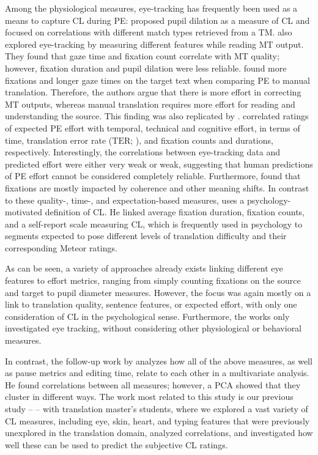 \documentclass[output=paper]{langsci/langscibook}
\begin{document}
Among the physiological measures, eye-tracking has frequently been used as a means to capture CL during PE:
\citet{obrien_eye-tracking_2006} proposed pupil dilation as a measure of CL and focused on correlations with different match types retrieved from a TM.
\citet{doherty2010eye} also explored eye-tracking by measuring different features while reading MT output. They found that gaze time and fixation count correlate with MT quality; however, fixation duration and pupil dilation were less reliable.
\citet{carl2011process} found more fixations and longer gaze times on the target text when comparing PE to manual translation. Therefore, the authors argue that there is more effort in correcting MT outputs, whereas manual translation requires more effort for reading and understanding the source. This finding was also replicated by \citet{koglin2015empirical}.
\citet{moorkens_correlations_2015} correlated ratings of expected PE effort with temporal, technical and cognitive effort, in terms of time, translation error rate ($\mathrm{TER}$; \citealp{TER:2006,TERp:2009}), and fixation counts and durations, respectively. Interestingly, the correlations between eye-tracking data and predicted effort were either very weak or weak, suggesting that human predictions of PE effort cannot be considered completely reliable.
Furthermore, \citet{daems2016translation} found that fixations are mostly impacted by coherence and other meaning shifts.
In contrast to these quality-, time-, and expectation-based measures, \citet{vieira2014indices} uses a psychology-motivated definition of CL. He linked average fixation duration, fixation counts, and a self-report scale measuring CL, which is frequently used in psychology \citep{paas1994instructional} to segments expected to pose different levels of translation difficulty and their corresponding Meteor \citep{Lavie:2007} ratings.

As can be seen, a variety of approaches already exists linking different eye features to effort metrics, ranging from simply counting fixations on the source and target to pupil diameter measures. However, the focus was again mostly on a link to translation quality, sentence features, or expected effort, with only one consideration of CL in the psychological sense. Furthermore, the works only investigated eye tracking, without considering other physiological or behavioral measures.

In contrast, the follow-up work by \citet{vieira2016measures} analyzes how all of the above measures, as well as pause metrics and editing time, relate to each other in a multivariate analysis. He found correlations between all measures; however, a PCA showed that they cluster in different ways.
The work most related to this study is our previous study -- \citet{herbig2019mt} -- with translation master's students, where we explored a vast variety of CL measures, including eye, skin, heart, and typing features that were previously unexplored in the translation domain, analyzed correlations, and investigated how well these can be used to predict the subjective CL ratings.
\end{document}
